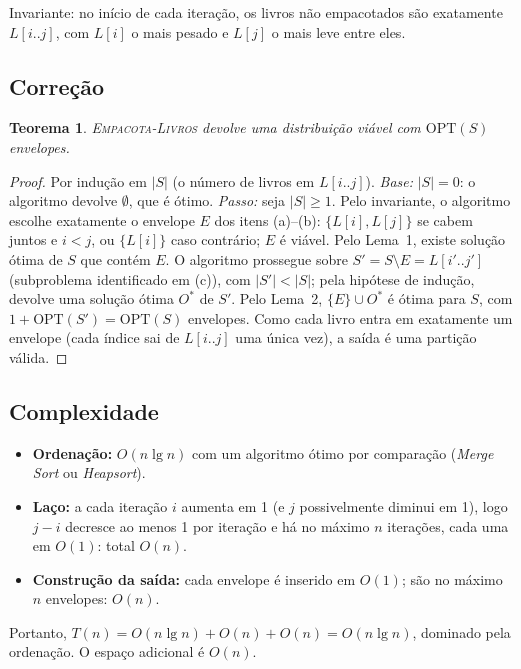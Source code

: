 \documentclass[11pt,a4paper]{article}
\newtheorem{teorema}{Teorema}
\begin{document}
Invariante: no início de cada iteração, os livros não empacotados são exatamente
$L[i..j]$, com $L[i]$ o mais pesado e $L[j]$ o mais leve entre eles.

\subsection{Correção}

\begin{teorema}
\textsc{Empacota-Livros} devolve uma distribuição viável com $\mathrm{OPT}(S)$ envelopes.
\end{teorema}

\begin{proof}
Por indução em $|S|$ (o número de livros em $L[i..j]$).
\emph{Base:} $|S| = 0$: o algoritmo devolve $\emptyset$, que é ótimo.
\emph{Passo:} seja $|S|\ge 1$. Pelo invariante, o algoritmo escolhe exatamente o
envelope $E$ dos itens (a)--(b): $\{L[i],L[j]\}$ se cabem juntos e $i<j$, ou
$\{L[i]\}$ caso contrário; $E$ é viável. Pelo Lema~1, existe solução ótima de $S$
que contém $E$. O algoritmo prossegue sobre $S' = S\setminus E = L[i'..j']$
(subproblema identificado em (c)), com $|S'| < |S|$; pela hipótese de indução,
devolve uma solução ótima $O^*$ de $S'$. Pelo Lema~2, $\{E\}\cup O^*$ é ótima para
$S$, com $1+\mathrm{OPT}(S') = \mathrm{OPT}(S)$ envelopes. Como cada livro entra em
exatamente um envelope (cada índice sai de $L[i..j]$ uma única vez), a saída é uma
partição válida.
\end{proof}

\subsection{Complexidade}

\begin{itemize}
  \item \textbf{Ordenação:} $O(n \lg n)$ com um algoritmo ótimo por comparação
        (\textit{Merge Sort} ou \textit{Heapsort}).
  \item \textbf{Laço:} a cada iteração $i$ aumenta em 1 (e $j$ possivelmente
        diminui em 1), logo $j-i$ decresce ao menos 1 por iteração e há no máximo
        $n$ iterações, cada uma em $O(1)$: total $O(n)$.
  \item \textbf{Construção da saída:} cada envelope é inserido em $O(1)$; são no
        máximo $n$ envelopes: $O(n)$.
\end{itemize}
Portanto, $T(n) = O(n\lg n) + O(n) + O(n) = O(n \lg n)$, dominado pela ordenação.
O espaço adicional é $O(n)$.
\end{document}
